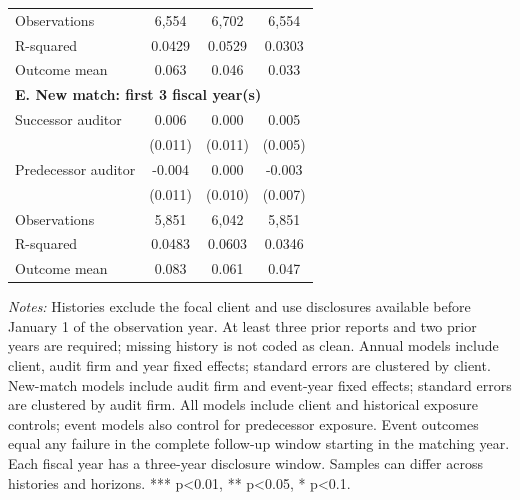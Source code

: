 \documentclass[10pt]{article}
\begin{document}
\begin{minipage}{19cm}
\begin{threeparttable}
\begin{tabular}{p{}ccc}
Observations & 6,554 & 6,702 & 6,554 \\
R-squared & 0.0429 & 0.0529 & 0.0303 \\
Outcome mean & 0.063 & 0.046 & 0.033 \\
\multicolumn{4}{l}{\textbf{E. New match: first 3 fiscal year(s)}} \\
Successor auditor & 0.006 & 0.000 & 0.005 \\
 & (0.011) & (0.011) & (0.005) \\
Predecessor auditor & -0.004 & 0.000 & -0.003 \\
 & (0.011) & (0.010) & (0.007) \\
Observations & 5,851 & 6,042 & 5,851 \\
R-squared & 0.0483 & 0.0603 & 0.0346 \\
Outcome mean & 0.083 & 0.061 & 0.047 \\
\bottomrule
\end{tabular}
\begin{tablenotes}\fontsize{9}{11}\selectfont
\item \raggedright \fontsize{9}{11}\selectfont \textit{Notes:} Histories exclude the focal client and use disclosures available before January 1 of the observation year. At least three prior reports and two prior years are required; missing history is not coded as clean. Annual models include client, audit firm and year fixed effects; standard errors are clustered by client. New-match models include audit firm and event-year fixed effects; standard errors are clustered by audit firm. All models include client and historical exposure controls; event models also control for predecessor exposure. Event outcomes equal any failure in the complete follow-up window starting in the matching year. Each fiscal year has a three-year disclosure window. Samples can differ across histories and horizons. *** p<0.01, ** p<0.05, * p<0.1.
\end{tablenotes}
\end{threeparttable}

\end{minipage}
\end{document}
